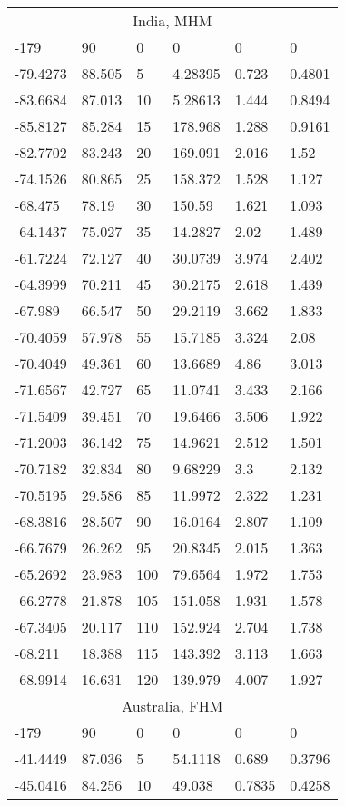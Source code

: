 \begin{longtable}[c]{@{}llllll@{}}
\multicolumn{6}{c}{India, MHM} \\
-179 & 90 & 0 & 0 & 0 & 0 \\
-79.4273 & 88.505 & 5 & 4.28395 & 0.723 & 0.4801 \\
-83.6684 & 87.013 & 10 & 5.28613 & 1.444 & 0.8494 \\
-85.8127 & 85.284 & 15 & 178.968 & 1.288 & 0.9161 \\
-82.7702 & 83.243 & 20 & 169.091 & 2.016 & 1.52 \\
-74.1526 & 80.865 & 25 & 158.372 & 1.528 & 1.127 \\
-68.475 & 78.19 & 30 & 150.59 & 1.621 & 1.093 \\
-64.1437 & 75.027 & 35 & 14.2827 & 2.02 & 1.489 \\
-61.7224 & 72.127 & 40 & 30.0739 & 3.974 & 2.402 \\
-64.3999 & 70.211 & 45 & 30.2175 & 2.618 & 1.439 \\
-67.989 & 66.547 & 50 & 29.2119 & 3.662 & 1.833 \\
-70.4059 & 57.978 & 55 & 15.7185 & 3.324 & 2.08 \\
-70.4049 & 49.361 & 60 & 13.6689 & 4.86 & 3.013 \\
-71.6567 & 42.727 & 65 & 11.0741 & 3.433 & 2.166 \\
-71.5409 & 39.451 & 70 & 19.6466 & 3.506 & 1.922 \\
-71.2003 & 36.142 & 75 & 14.9621 & 2.512 & 1.501 \\
-70.7182 & 32.834 & 80 & 9.68229 & 3.3 & 2.132 \\
-70.5195 & 29.586 & 85 & 11.9972 & 2.322 & 1.231 \\
-68.3816 & 28.507 & 90 & 16.0164 & 2.807 & 1.109 \\
-66.7679 & 26.262 & 95 & 20.8345 & 2.015 & 1.363 \\
-65.2692 & 23.983 & 100 & 79.6564 & 1.972 & 1.753 \\
-66.2778 & 21.878 & 105 & 151.058 & 1.931 & 1.578 \\
-67.3405 & 20.117 & 110 & 152.924 & 2.704 & 1.738 \\
-68.211 & 18.388 & 115 & 143.392 & 3.113 & 1.663 \\
-68.9914 & 16.631 & 120 & 139.979 & 4.007 & 1.927 \\
\multicolumn{6}{c}{Australia, FHM} \\
-179 & 90 & 0 & 0 & 0 & 0 \\
-41.4449 & 87.036 & 5 & 54.1118 & 0.689 & 0.3796 \\
-45.0416 & 84.256 & 10 & 49.038 & 0.7835 & 0.4258 \\

\end{longtable}
